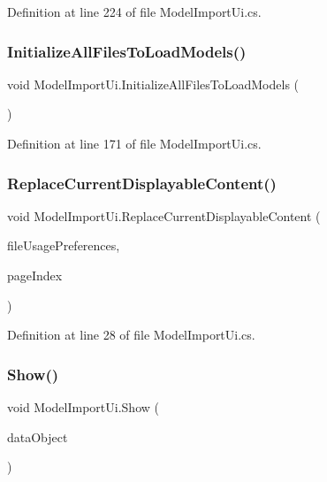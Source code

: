 Definition at line 224 of file Model\+Import\+Ui.\+cs.

\mbox{\label{class_model_import_ui_a193c32700872638392857e078af43ad2}} 
\subsubsection{\texorpdfstring{InitializeAllFilesToLoadModels()}{InitializeAllFilesToLoadModels()}}
{\footnotesize\ttfamily void Model\+Import\+Ui.\+Initialize\+All\+Files\+To\+Load\+Models (\begin{DoxyParamCaption}{ }\end{DoxyParamCaption})}



Definition at line 171 of file Model\+Import\+Ui.\+cs.

\mbox{\label{class_model_import_ui_ad69f1875dc693625b159ae37b5d86671}} 
\subsubsection{\texorpdfstring{ReplaceCurrentDisplayableContent()}{ReplaceCurrentDisplayableContent()}}
{\footnotesize\ttfamily void Model\+Import\+Ui.\+Replace\+Current\+Displayable\+Content (\begin{DoxyParamCaption}\item[{List$<$ \mbox{\hyperlink{class_file_usage_preference}{File\+Usage\+Preference}} $>$}]{file\+Usage\+Preferences,  }\item[{int}]{page\+Index }\end{DoxyParamCaption})}



Definition at line 28 of file Model\+Import\+Ui.\+cs.

\mbox{\label{class_model_import_ui_a8f2d7bf13a1f5ad893e24106a56df774}} 
\subsubsection{\texorpdfstring{Show()}{Show()}}
{\footnotesize\ttfamily void Model\+Import\+Ui.\+Show (\begin{DoxyParamCaption}\item[{object}]{data\+Object }\end{DoxyParamCaption})}



